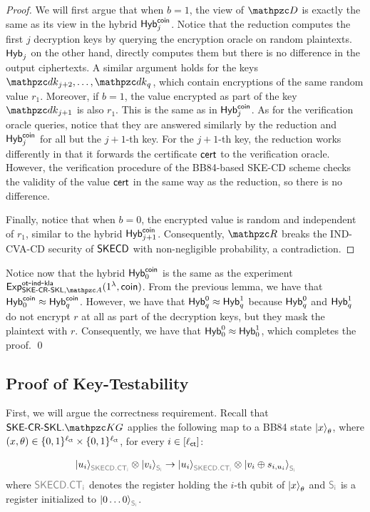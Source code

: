 \begin{proof}
We will first argue that when $b=1$, the view of $\qD$ is exactly
the same as its view in the hybrid $\mathsf{Hyb}_j^{\mathsf{coin}}$. Notice that the
reduction computes the first $j$ decryption keys by querying the
encryption oracle on random plaintexts. $\mathsf{Hyb}_j$ on the other hand,
directly computes them but there is no difference in the
output ciphertexts. A similar argument holds for the keys
$\qdk_{j+2}, \ldots, \qdk_q$, which contain encryptions of the same
random value $r_1$. Moreover, if $b=1$, the value encrypted as part
of the key $\qdk_{j+1}$ is also $r_1$. This is the same as in
$\mathsf{Hyb}_j^{\mathsf{coin}}$. As for the verification oracle queries, notice that
they are answered similarly by the reduction and $\mathsf{Hyb}_j^{\mathsf{coin}}$ for
all but the $j+1$-th key. For the $j+1$-th key, the reduction works
differently in that it forwards the certificate $\mathsf{cert}$ to the
verification oracle.  However, the verification procedure of the
BB84-based SKE-CD scheme checks the validity of the value $\mathsf{cert}$ in
the same way as the reduction, so there is no difference.

Finally, notice that when $b=0$, the encrypted value is random and
independent of $r_1$, similar to the hybrid $\mathsf{Hyb}_{j+1}^{\mathsf{coin}}$.
Consequently, $\qR$ breaks the IND-CVA-CD security of $\mathsf{SKECD}$ with
non-negligible probability, a contradiction.
\end{proof}

Notice now that the hybrid $\mathsf{Hyb}_0^{\mathsf{coin}}$ is the same as the
experiment $\expc{\SKECRSKL,\qA}{ot}{ind}{kla}\allowbreak(1^\secp,\coin)$. From
the previous lemma, we have that $\mathsf{Hyb}_0^{\mathsf{coin}} \approx
\mathsf{Hyb}_q^{\mathsf{coin}}$. However, we have that $\mathsf{Hyb}_q^0 \approx \mathsf{Hyb}_q^1$
because $\mathsf{Hyb}_q^0$ and $\mathsf{Hyb}_q^1$ do not encrypt $r$ at all as part
of the decryption keys, but they mask the plaintext with $r$.
Consequently, we have that $\mathsf{Hyb}_0^0 \approx \mathsf{Hyb}_0^1$, which
completes the proof. \qed



\subsection{Proof of Key-Testability}\label{proof:kt}

First, we will argue the correctness requirement. Recall that
$\SKECRSKL.\qKG$ applies the following map to a BB84 state
$\ket{x}_\theta$, where $(x, \theta) \in
\{0,1\}^{\ell_{\mathsf{ct}}}\times\{0,1\}^{\ell_{\mathsf{ct}}}$, for every $i \in [\ell_{\mathsf{ct}}]$:

\begin{align}
\ket{u_i}_{\qreg{SKECD.CT_i}}\tensor\ket{v_i}_{\qreg{S_i}}
\ra
\ket{u_i}_{\qreg{SKECD.CT_i}}\tensor\ket{v_i\oplus
s_{i,u_i}}_{\qreg{S_i}}
\end{align}
where $\qreg{SKECD.CT_i}$ denotes the register holding the $i$-th
qubit of $\ket{x}_\theta$ and $\qreg{S_i}$ is a register initialized
to $\ket{0\ldots0}_{\qreg{S_i}}$.

